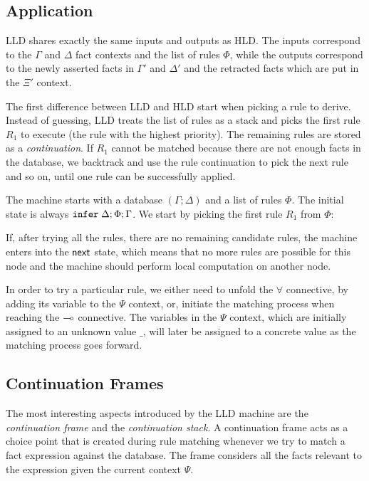 \subsection{Application}

LLD shares exactly the same inputs and outputs as HLD. The inputs correspond to
the $\Gamma$ and $\Delta$ fact contexts and the list of rules $\Phi$, while the
outputs correspond to the newly asserted facts in $\Gamma'$ and $\Delta'$ and
the retracted facts which are put in the $\Xi'$ context.

The first difference between LLD and HLD start when picking a rule to derive.
Instead of guessing, LLD treats the list of rules as a stack and picks the first
rule $R_1$ to execute (the rule with the highest priority). The remaining rules
are stored as a \emph{continuation}. If $R_1$ cannot be matched because there
are not enough facts in the database, we backtrack and use the rule continuation
to pick the next rule and so on, until one rule can be successfully applied.

The machine starts with a database $(\Gamma; \Delta)$ and a list of rules
$\Phi$. The initial state is always $\mathtt{infer} \; \Delta; \Phi; \Gamma$.
We start by picking the first rule $R_1$ from $\Phi$:



If, after trying all the rules, there are no remaining candidate rules, the
machine enters into the $\mathsf{next}$ state, which means that no more rules are
possible for this node and the machine should perform local computation on
another node.



In order to try a particular rule, we either need to unfold the $\forall$
connective, by adding its variable to the $\Psi$ context, or, initiate the matching
process when reaching the $\multimap$ connective. The variables in the $\Psi$
context, which are initially assigned to an unknown value $\_$, will later be
assigned to a concrete value as the matching process goes forward.




\subsection{Continuation Frames}

The most interesting aspects introduced by the LLD machine are the
\emph{continuation frame} and the \emph{continuation stack}. A continuation
frame acts as a choice point that is created during rule matching whenever we
try to match a fact expression against the database.  The frame considers all
the facts relevant to the expression given the current context $\Psi$.

